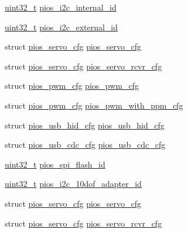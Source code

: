 \begin{DoxyCompactItemize}
\item 
\hyperlink{stdint_8h_a435d1572bf3f880d55459d9805097f62}{uint32\-\_\-t} \hyperlink{group___tau_labs_core_gad2c74451613ce4fb69f79e9941dde55e}{pios\-\_\-i2c\-\_\-internal\-\_\-id}
\item 
\hyperlink{stdint_8h_a435d1572bf3f880d55459d9805097f62}{uint32\-\_\-t} \hyperlink{group___tau_labs_core_gaf4ee551b590f93e58b18620150d923e6}{pios\-\_\-i2c\-\_\-external\-\_\-id}
\item 
struct \hyperlink{structpios__servo__cfg}{pios\-\_\-servo\-\_\-cfg} \hyperlink{group___tau_labs_core_ga57a87ef16d7949a9cc3589efc8d88a28}{pios\-\_\-servo\-\_\-cfg}
\item 
struct \hyperlink{structpios__servo__cfg}{pios\-\_\-servo\-\_\-cfg} \hyperlink{group___tau_labs_core_gaa111328ef9a12c806ed1c24b93d4f663}{pios\-\_\-servo\-\_\-rcvr\-\_\-cfg}
\item 
struct \hyperlink{structpios__pwm__cfg}{pios\-\_\-pwm\-\_\-cfg} \hyperlink{group___tau_labs_core_ga7587f8e174df90bef8cec1edfa9e14c1}{pios\-\_\-pwm\-\_\-cfg}
\item 
struct \hyperlink{structpios__pwm__cfg}{pios\-\_\-pwm\-\_\-cfg} \hyperlink{group___tau_labs_core_ga6a7a8338c617f18384f3b3c5678f5505}{pios\-\_\-pwm\-\_\-with\-\_\-ppm\-\_\-cfg}
\item 
struct \hyperlink{structpios__usb__hid__cfg}{pios\-\_\-usb\-\_\-hid\-\_\-cfg} \hyperlink{group___tau_labs_core_ga3665f6d3a2cccc431b55b9432291e94c}{pios\-\_\-usb\-\_\-hid\-\_\-cfg}
\item 
struct \hyperlink{structpios__usb__cdc__cfg}{pios\-\_\-usb\-\_\-cdc\-\_\-cfg} \hyperlink{group___tau_labs_core_ga05cc3e449d417c7f9097d2659e6f5ca3}{pios\-\_\-usb\-\_\-cdc\-\_\-cfg}
\item 
\hyperlink{stdint_8h_a435d1572bf3f880d55459d9805097f62}{uint32\-\_\-t} \hyperlink{group___tau_labs_core_gaebc54f2c5fc298fad979df4d9bd1414b}{pios\-\_\-spi\-\_\-flash\-\_\-id}
\item 
\hyperlink{stdint_8h_a435d1572bf3f880d55459d9805097f62}{uint32\-\_\-t} \hyperlink{group___tau_labs_core_ga697e424a8ada2da6558bd1576496df09}{pios\-\_\-i2c\-\_\-10dof\-\_\-adapter\-\_\-id}
\item 
struct \hyperlink{structpios__servo__cfg}{pios\-\_\-servo\-\_\-cfg} \hyperlink{group___tau_labs_core_ga57a87ef16d7949a9cc3589efc8d88a28}{pios\-\_\-servo\-\_\-cfg}
\item 
struct \hyperlink{structpios__servo__cfg}{pios\-\_\-servo\-\_\-cfg} \hyperlink{group___tau_labs_core_gaa111328ef9a12c806ed1c24b93d4f663}{pios\-\_\-servo\-\_\-rcvr\-\_\-cfg}

\end{DoxyCompactItemize}
